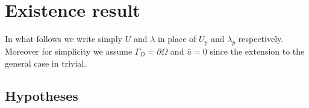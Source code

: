 %
%

\section{Existence result}

In what follows we write simply $U$ and $\lambda$ in place of $U_p$ and $\lambda_p$ respectively. Moreover for simplicity we assume $\Gamma_D=\partial\Omega$ and $\bar{u}=0$ since the extension to the general case in trivial.

\subsection{Hypotheses}
\label{subsec:hypotheses}

